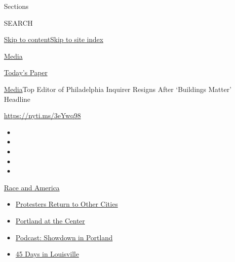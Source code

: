 Sections

SEARCH

\protect\hyperlink{site-content}{Skip to
content}\protect\hyperlink{site-index}{Skip to site index}

\href{https://www.nytimes3xbfgragh.onion/section/business/media}{Media}

\href{https://myaccount.nytimes3xbfgragh.onion/auth/login?response_type=cookie\&client_id=vi}{}

\href{https://www.nytimes3xbfgragh.onion/section/todayspaper}{Today's
Paper}

\href{/section/business/media}{Media}\textbar{}Top Editor of
Philadelphia Inquirer Resigns After `Buildings Matter' Headline

\url{https://nyti.ms/3eYwq98}

\begin{itemize}
\item
\item
\item
\item
\item
\end{itemize}

\href{https://www.nytimes3xbfgragh.onion/news-event/george-floyd-protests-minneapolis-new-york-los-angeles?action=click\&pgtype=Article\&state=default\&region=TOP_BANNER\&context=storylines_menu}{Race
and America}

\begin{itemize}
\tightlist
\item
  \href{https://www.nytimes3xbfgragh.onion/2020/07/26/us/protests-portland-seattle-trump.html?action=click\&pgtype=Article\&state=default\&region=TOP_BANNER\&context=storylines_menu}{Protesters
  Return to Other Cities}
\item
  \href{https://www.nytimes3xbfgragh.onion/2020/07/24/us/portland-oregon-protests-white-race.html?action=click\&pgtype=Article\&state=default\&region=TOP_BANNER\&context=storylines_menu}{Portland
  at the Center}
\item
  \href{https://www.nytimes3xbfgragh.onion/2020/07/23/podcasts/the-daily/portland-protests.html?action=click\&pgtype=Article\&state=default\&region=TOP_BANNER\&context=storylines_menu}{Podcast:
  Showdown in Portland}
\item
  \href{https://www.nytimes3xbfgragh.onion/interactive/2020/07/16/us/black-lives-matter-protests-louisville-breonna-taylor.html?action=click\&pgtype=Article\&state=default\&region=TOP_BANNER\&context=storylines_menu}{45
  Days in Louisville}
\end{itemize}

